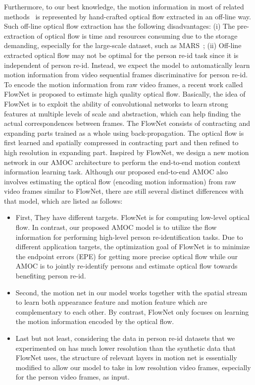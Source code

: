 \documentclass[journal]{IEEEtran}
\begin{document}
Furthermore, to our best knowledge, the motion information in most of related methods~\cite{simonyan2014two, feichtenhofer2016convolutional, mclaughlinrecurrent} is represented by hand-crafted optical flow extracted in an off-line way. Such off-line optical flow extraction has the following disadvantages: (i) The pre-extraction of optical flow is time and resources consuming due to the storage demanding, especially for the large-scale dataset, such as MARS~\cite{zheng2016mars}; (ii) Off-line extracted optical flow may not be optimal for the person re-id task since it is independent of person re-id. Instead, we expect the model to automatically learn motion information from video sequential frames discriminative for person re-id. To encode the motion information from raw video frames, a recent work called FlowNet\cite{dosovitskiy2015flownet} is proposed to estimate high quality optical flow. Basically, the idea of FlowNet is to exploit the ability of convolutional networks to learn strong features at multiple levels of scale and abstraction, which can help finding the actual correspondences between frames. The FlowNet consists of contracting and expanding parts trained as a whole using back-propagation. The optical flow is first learned and spatially compressed in contracting part and then refined to high resolution in expanding part. Inspired by FlowNet, we design a new motion network in our AMOC architecture to perform the end-to-end motion context information learning task. Although our proposed end-to-end AMOC also involves estimating the optical flow (encoding motion information) from raw video frames similar to FlowNet, there are still several distinct differences with that model, which are listed as follows: 
\begin{itemize} 
\item First, They have different targets. FlowNet is for computing low-level optical flow. In contrast, our proposed AMOC model is to utilize the flow information for performing high-level person re-identification tasks. Due to different application targets, the optimization goal of FlowNet is to minimize the endpoint errors (EPE)\cite{dosovitskiy2015flownet} for getting more precise optical flow while our AMOC is to jointly re-identify persons and estimate optical flow towards benefiting person re-id.   

\item Second, the motion net in our model works together with the spatial stream to learn both appearance feature and motion feature which are complementary to each other. By contrast, FlowNet only focuses on learning the motion information encoded by the optical flow.

\item  Last but not least, considering the data in person re-id datasets that we experimented on has much lower resolution than the synthetic data that FlowNet uses, the structure of relevant layers in motion net is essentially modified to allow our model to take in low resolution video frames, especially for the person video frames, as input.

\end{itemize} 
\end{document}
